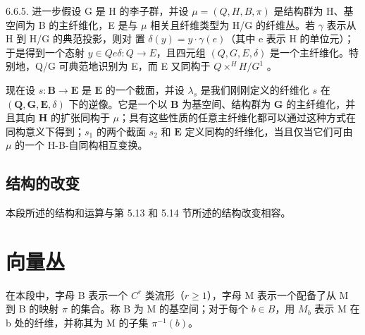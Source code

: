 6.6.5. 进一步假设 G 是 H 的李子群，并设 \(\mu = (Q, H, B, \pi)\) 是结构群为 H、基空间为 B 的主纤维化，E 是与 \(\mu\) 相关且纤维类型为 H/G 的纤维丛。若 \(\gamma\) 表示从 H 到 H/G 的典范投影，则对  置 \(\delta(y) = y \cdot \gamma(e)\)（其中 e 表示 H 的单位元）；于是得到一个态射 \(y \in Q\)\(e\)\(\delta: Q \to E\)，且四元组 \((Q, G, E, \delta)\) 是一个主纤维化。特别地，Q/G 可典范地识别为 E，而 E 又同构于 \(Q \times^{H} H/G^{1}\) 。

现在设 \(s: \mathbf{B} \to \mathbf{E}\) 是 \(\mathbf{E}\) 的一个截面，并设 \(\lambda_s\) 是我们刚刚定义的纤维化 \(s\) 在 \((\mathbf{Q}, \mathbf{G}, \mathbf{E}, \delta)\) 下的逆像。它是一个以 \(\mathbf{B}\) 为基空间、结构群为 \(\mathbf{G}\) 的主纤维化，并且其向 \(\mathbf{H}\) 的扩张同构于 \(\mu\)；具有这些性质的任意主纤维化都可以通过这种方式在同构意义下得到；\(s_1\) 的两个截面 \(s_2\) 和 \(\mathbf{E}\) 定义同构的纤维化，当且仅当它们可由 \(\mu\) 的一个 H-B-自同构相互变换。

\subsection{结构的改变}

本段所述的结构和运算与第 5.13 和 5.14 节所述的结构改变相容。

\section{向量丛}

在本段中，字母 B 表示一个 \(C^{r}\) 类流形（\(r \geqslant 1\)），字母 M 表示一个配备了从 M 到 B 的映射 \(\pi\) 的集合。称 B 为 M 的基空间；对于每个 \(b \in B\)，用 \(M_{b}\) 表示 M 在 b 处的纤维，并称其为 M 的子集 \(\pi^{-1}(b)\)。
